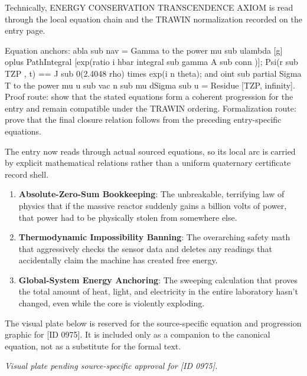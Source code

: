 Technically, ENERGY CONSERVATION TRANSCENDENCE AXIOM is read through the local equation chain and the TRAWIN normalization recorded on the entry page.

Equation anchors: abla sub nav = Gamma to the power mu sub ulambda [g] oplus PathIntegral [exp(ratio i hbar integral sub gamma A sub conn )]; Psi(r sub TZP , t) == J sub 0(2.4048 rho) times exp(i n theta); and oint sub partial Sigma T to the power mu u sub vac n sub mu dSigma sub u = Residue [TZP, infinity]. Proof route: show that the stated equations form a coherent progression for the entry and remain compatible under the TRAWIN ordering. Formalization route: prove that the final closure relation follows from the preceding entry-specific equations.

The entry now reads through actual sourced equations, so its local arc is carried by explicit mathematical relations rather than a uniform quaternary certificate record shell.
\endgroup

\begin{enumerate}[leftmargin=1.6em,itemsep=6pt,topsep=4pt]
\item \textbf{Absolute-Zero-Sum Bookkeeping}: The unbreakable, terrifying law of physics that if the massive reactor suddenly gains a billion volts of power, that power had to be physically stolen from somewhere else.
\item \textbf{Thermodynamic Impossibility Banning}: The overarching safety math that aggressively checks the sensor data and deletes any readings that accidentally claim the machine has created free energy.
\item \textbf{Global-System Energy Anchoring}: The sweeping calculation that proves the total amount of heat, light, and electricity in the entire laboratory hasn't changed, even while the core is violently exploding.
\end{enumerate}

\begingroup\footnotesize\sloppy
The visual plate below is reserved for the source-specific equation and progression graphic for [ID 0975]. It is included only as a companion to the canonical equation, not as a substitute for the formal text.
\par\endgroup
\begingroup\footnotesize\itshape
Visual plate pending source-specific approval for [ID 0975].
\par\endgroup

